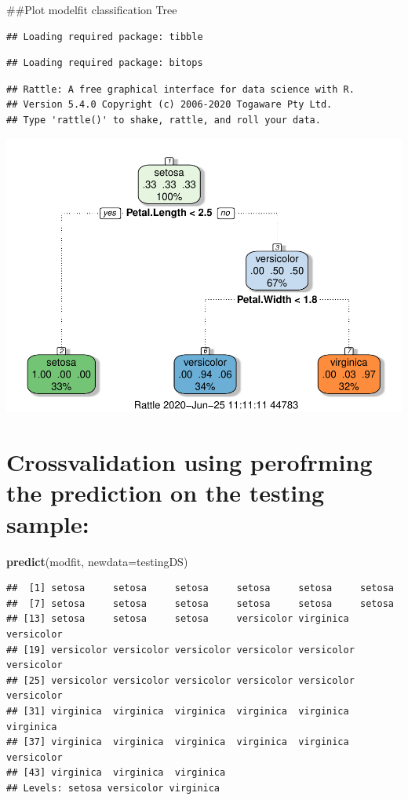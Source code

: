 \documentclass[
]{article}
\newenvironment{Shaded}{\begin{snugshade}}{\end{snugshade}}
\newcommand{\DataTypeTok}[1]{\textcolor[rgb]{0.13,0.29,0.53}{#1}}
\newcommand{\KeywordTok}[1]{\textcolor[rgb]{0.13,0.29,0.53}{\textbf{#1}}}
\newcommand{\NormalTok}[1]{#1}
\begin{document}
\#\#Plot modelfit classification Tree

\begin{verbatim}
## Loading required package: tibble
\end{verbatim}

\begin{verbatim}
## Loading required package: bitops
\end{verbatim}

\begin{verbatim}
## Rattle: A free graphical interface for data science with R.
## Version 5.4.0 Copyright (c) 2006-2020 Togaware Pty Ltd.
## Type 'rattle()' to shake, rattle, and roll your data.
\end{verbatim}

\includegraphics{crtrf_files/figure-latex/unnamed-chunk-5-1.pdf}

\hypertarget{crossvalidation-using-perofrming-the-prediction-on-the-testing-sample}{%
\section{Crossvalidation using perofrming the prediction on the testing
sample:}\label{crossvalidation-using-perofrming-the-prediction-on-the-testing-sample}}

\begin{Shaded}
\begin{Highlighting}[]
\KeywordTok{predict}\NormalTok{(modfit, }\DataTypeTok{newdata=}\NormalTok{testingDS)}
\end{Highlighting}
\end{Shaded}

\begin{verbatim}
##  [1] setosa     setosa     setosa     setosa     setosa     setosa    
##  [7] setosa     setosa     setosa     setosa     setosa     setosa    
## [13] setosa     setosa     setosa     versicolor virginica  versicolor
## [19] versicolor versicolor versicolor versicolor versicolor versicolor
## [25] versicolor versicolor versicolor versicolor versicolor versicolor
## [31] virginica  virginica  virginica  virginica  virginica  virginica 
## [37] virginica  virginica  virginica  virginica  virginica  versicolor
## [43] virginica  virginica  virginica 
## Levels: setosa versicolor virginica
\end{verbatim}
\end{document}
